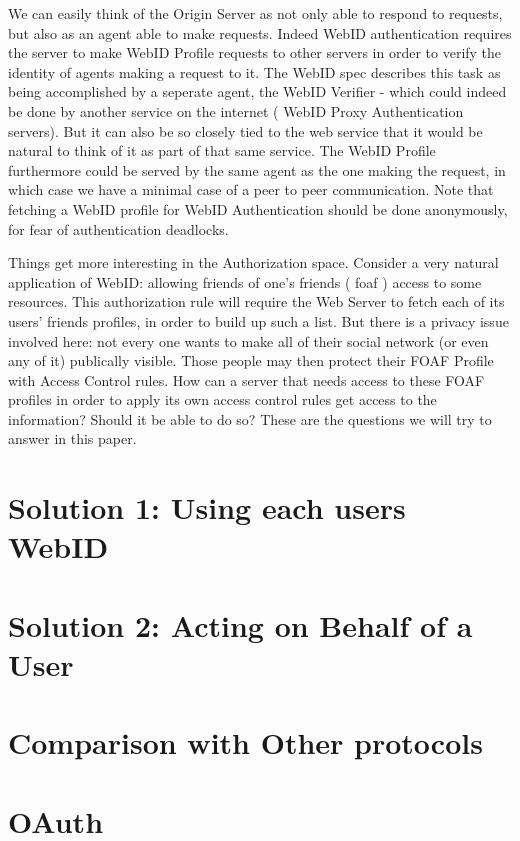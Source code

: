 \documentclass[a4paper]{llncs}
\begin{document}
We can easily think of the Origin Server as not only able to respond to requests, but also as an agent able to make
requests. Indeed WebID authentication requires the server to make WebID Profile requests to other servers in order to verify the identity of agents making a request to it. The WebID spec describes this task as being accomplished by a seperate agent, the WebID Verifier - which could indeed be done by another service on the internet ( WebID Proxy Authentication servers). But it can also be so closely tied to the web service that it would be natural to think of it as part of that same service. The WebID Profile furthermore could be served by the same agent as the one making the request, in which case we have a minimal case of a peer to peer communication.  Note that fetching a WebID profile for WebID Authentication should be done anonymously, for fear of authentication deadlocks. 

Things get more interesting in the Authorization space. Consider a very natural application of WebID: allowing friends of one's friends ( foaf ) access to some resources. This authorization rule will require the Web Server to fetch each of its users' friends profiles, in order to build up such a list. But there is a privacy issue involved here: not every one wants to make all of their social network (or even any of it) publically visible. Those people may then protect their FOAF Profile with Access Control rules. How can a server that needs access to these FOAF profiles in order to apply its own access control rules get access to the information? Should it be able to do so? These are the questions we will try to answer in this paper.

\section{Solution 1: Using each users WebID}

\section{Solution 2: Acting on Behalf of a User}

\section{Comparison with Other protocols}

\section{OAuth}
\end{document}
